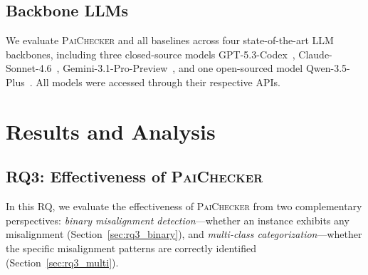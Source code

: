 \documentclass[sigconf, review, anonymous]{acmart}
\newcommand{\tool}{\textsc{PaiChecker}\xspace}
\begin{document}
    \subsection{Backbone LLMs}
    \label{sec:backbone}

    We evaluate \tool and all baselines across four state-of-the-art LLM backbones, including three closed-source models GPT-5.3-Codex~\cite{gpt53codex}, Claude-Sonnet-4.6~\cite{claudesonnet46}, Gemini-3.1-Pro-Preview~\cite{gemini31pro}, and one open-sourced model Qwen-3.5-Plus~\cite{qwen35}. All models were accessed through their respective APIs.

    \section{Results and Analysis}
    \label{sec:results}

    \subsection{RQ3: Effectiveness of \tool}
    \label{sec:rq3}

    In this RQ, we evaluate the effectiveness of \tool from two complementary perspectives: \textit{binary misalignment detection}---whether an instance exhibits any misalignment (Section~\ref{sec:rq3_binary}), and \textit{multi-class categorization}---whether the specific misalignment patterns are correctly identified (Section~\ref{sec:rq3_multi}).

\end{document}
